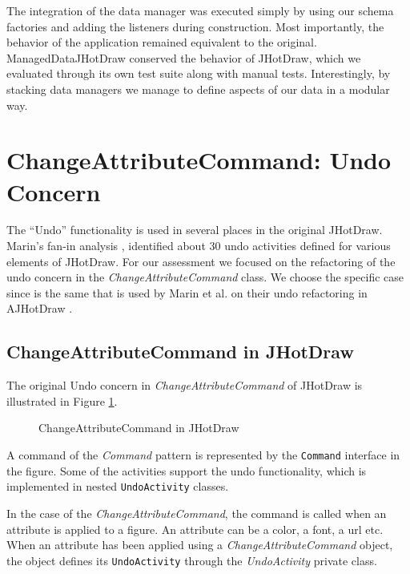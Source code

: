 The integration of the data manager was executed simply by using our schema factories and adding the listeners during construction.
Most importantly, the behavior of the application remained equivalent to the original.
ManagedDataJHotDraw conserved the behavior of JHotDraw, which we evaluated through its own test suite along with manual tests.
Interestingly, by stacking data managers we manage to define aspects of our data in a modular way.

\section{ChangeAttributeCommand: Undo Concern}
The ``Undo'' functionality is used in several places in the original JHotDraw.
Marin's fan-in analysis \cite{marin2004identifying}, identified about 30 undo activities defined for various elements of JHotDraw. 
For our assessment we focused on the refactoring of the undo concern in the \textit{ChangeAttributeCommand} class.
We choose the specific case since is the same that is used by Marin et al. on their undo refactoring in AJHotDraw \cite{marin2004refactoring}.

\subsection{ChangeAttributeCommand in JHotDraw}
The original Undo concern in \textit{ChangeAttributeCommand} of JHotDraw is illustrated in Figure \ref{fig:JHotDraw_Undo_Command_ChangeAttributeCommand_OOP}.

\begin{figure} [H]
	\centering
  	\caption{ChangeAttributeCommand in JHotDraw}
  	\label{fig:JHotDraw_Undo_Command_ChangeAttributeCommand_OOP}
\end{figure}

A command of the \textit{Command} pattern is represented by the \texttt{Command} interface in the figure. 
Some of the activities support the undo functionality, which is implemented in nested \texttt{UndoActivity} classes.

In the case of the \textit{ChangeAttributeCommand}, the command is called when an attribute is applied to a figure.
An attribute can be a color, a font, a url etc.
When an attribute has been applied using a \textit{ChangeAttributeCommand} object, the object defines its \texttt{UndoActivity} through the \textit{UndoActivity} private class.

